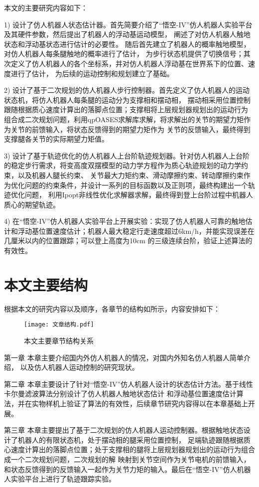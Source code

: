 本文的主要研究内容如下：

1) 设计了仿人机器人状态估计器。首先简要介绍了“悟空-IV”仿人机器人实验平台及其硬件参数，然后提出了机器人的浮动基运动模型，
阐述了对仿人机器人触地状态和浮动基状态进行估计的必要性。
随后首先建立了机器人的概率触地模型，对仿人机器人每条腿触地的概率进行了估计，
为步行状态机提供了切换信号；其次定义了仿人机器人的各个坐标系，并对仿人机器人浮动基在世界系下的位置、速度进行了估计，
为后续的运动控制和规划建立了基础。

2) 设计了基于二次规划的仿人机器人步行控制器。首先定义了仿人机器人的运动状态机，将仿人机器人每条腿的运动分为支撑相和摆动相，
摆动相采用位置控制跟随根据质心速度计算出的落脚点位置；支撑相将上层规划器规划出的运动行为
组合成二次规划问题，利用qpOASES求解库求解，将求解出的关节的期望力矩作为关节的前馈输入，将状态反馈得到的期望力矩作为
关节的反馈输入，最终得到支撑腿各关节的实际期望力矩值。

3) 设计了基于轨迹优化的仿人机器人上台阶轨迹规划器。针对仿人机器人上台阶的稳定步行需求，将变高度双摆模型的动力学方程作为质心轨迹规划的动力学约束，以及机器人腿长约束、
关节最大力矩约束、滑动摩擦约束、转动摩擦约束作为优化问题的约束条件，并设计一系列的目标函数以及正则项，最终构建出一个轨迹优化问题，
利用Ipopt非线性优化求解器求解，最终得到登上台阶过程中机器人质心的期望轨迹。

4) 在“悟空-IV”仿人机器人实验平台上开展实验：实现了仿人机器人可靠的触地估计和浮动基位置速度估计；机器人最大稳定行走速度超过6km/h，并能实现误差在几厘米以内的位置跟踪；可以登上高度为10cm
的三级连续台阶，验证上述算法的有效性。

\section{本文主要结构}
根据本文的研究内容以及顺序，各章节的结构如所示，内容安排如下：
\begin{figure}[h]
    \centering
    \texttt{[image: 文章结构.pdf]}
    \caption{\label{fig:artticle_struct}本文主要章节结构关系}
\end{figure}
第一章 本章主要介绍国内外仿人机器人的情况，对国内外知名仿人机器人简单介绍，
以及仿人机器人运动控制的研究现状。

第二章 本章主要设计了针对“悟空-IV”仿人机器人设计的状态估计方法。基于线性卡尔曼滤波算法分别设计了仿人机器人触地状态估计
和浮动基位置速度估计算法，并在实物样机上验证了算法的有效性，后续章节研究内容得以在本章基础上开展。

第三章 本章主要提出了基于二次规划的仿人机器人运动控制器。根据触地状态设计了机器人的有限状态机，处于摆动相的腿采用位置控制，
足端轨迹跟随根据质心速度计算出的落脚点位置；处于支撑相的腿将上层规划器规划出的运动行为组合成一个二次规划问题，二次规划的解
映射到关节空间作为关节电机的前馈输入，和状态反馈得到的反馈输入一起作为关节力矩的输入。最后在“悟空-IV”仿人机器人实验平台上进行了轨迹跟踪实验。


